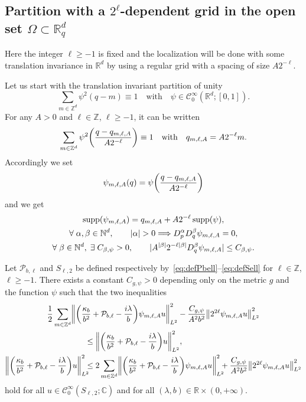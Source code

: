 \documentclass[10pt]{amsart}
\theoremstyle{definition}\newtheorem{defi}[theo]{Definition}\newtheorem{rema}[theo]{Remark}\newtheorem{exam}[theo]{Example}\newtheorem{exem}[theo]{Example}\newtheorem{nota}[theo]{Notation}
\newcommand{\C}{\mathbb{C}}
\newcommand{\Z}{\mathbb{Z}}
\newcommand{\R}{\mathbb{R}}
\newcommand{\N}{\mathbb{N}}
\newcommand{\clC}{\mathcal{C}}
\newcommand{\clP}{\mathcal{P}}
\DeclareMathOperator{\suppp}{supp}
\newcommand\norm[1]{\left\lVert#1\right\rVert}
\let\oldexists\exists
\renewcommand*{\exists}{\mathrel{\oldexists}}
\let\oldforall\forall
\renewcommand*{\forall}{\mathrel{\oldforall}}
\let\originalleft\left
\let\originalright\right
\renewcommand{\left}{\mathopen{}\mathclose\bgroup\originalleft}
\renewcommand{\right}{\aftergroup\egroup\originalright}
\renewcommand*{\implies}{\mathchoice{\Longrightarrow}{\Rightarrow}{\Rightarrow}{\Rightarrow}}
\begin{document}
\subsection{Partition with a \texorpdfstring{$2^\ell$}{2\^l}-dependent grid in the open set \texorpdfstring{$\Omega\subset\R^d_q$}{Omegac R\^d\_q}}\label{sec:gridpart}
Here the integer $\ell\geq -1$ is fixed and the localization will be done with some translation invariance in $\R^d$ by using a regular grid with a spacing of size $A2^{-\ell}$.

Let us start with the translation invariant partition of unity
\begin{equation}\label{eq:DefinitionOfPsi}
\sum_{m\in\Z^d}\psi^2(q-m)\equiv 1\quad\text{with}\quad\psi\in \clC^{\infty}_0(\R^d;[0,1]).
\end{equation}
For any $A>0$ and $\ell\in\Z$, $\ell\geq -1$, it can be written
\[
\sum_{m\in\Z^d}\psi^2\left(\frac{q-q_{m,\ell,A}}{A2^{-\ell}}\right)\equiv 1\quad \text{with}\quad q_{m,\ell,A}=A2^{-\ell}m.
\]
Accordingly we set
\[
\psi_{m,\ell,A}(q)=\psi\left(\frac{q-q_{m,\ell,A}}{A2^{-\ell}}\right)
\]
and we get
\begin{gather}
 \suppp(\psi_{m,\ell,A}) = q_{m,\ell,A}+A2^{-\ell}\suppp(\psi), \\
\forall \alpha, \beta \in \N^{d}, \qquad |\alpha|>0 \implies D_{p}^{\alpha}D_{q}^{\beta}\psi_{m,\ell,A} = 0, \\
\forall \beta \in \N^{d}, \;\exists C_{\beta,\psi}>0, \qquad |A^{|\beta|}2^{-\ell|\beta|} D_{q}^{\beta}\psi_{m,\ell,A}| \leq C_{\beta,\psi}.\label{eq:derpsimellA}
\end{gather}

\pagebreak
\begin{prop}\label{pr:controlOfErrorAfterGridPartitionOfUnity}
Let $\clP_{b,\ell}$ and $S_{\ell,2}$ be defined respectively by~\eqref{eq:defPbell}--\eqref{eq:defSell} for $\ell\in\Z$, $\ell\geq -1$. There exists a constant $C_{g,\psi}>0$ depending only on the metric $g$ and the function $\psi$ such that the two inequalities
\begin{multline*}
\frac{1}{2}\sum_{m\in \Z^d}\left\| \left(\frac{\kappa_{b}}{b^{2}}+\clP_{b,\ell} - \frac{i\lambda}{b}\right) \psi_{m,\ell,A}u \right\|^{2}_{L^2}-\frac{C_{g,\psi}}{A^2b^2}\norm{2^{2\ell}\psi_{m,\ell,A}u}_{L^2}^2\\
\begin{aligned}
&\leq
\left\| \left(\frac{\kappa_{b}}{b^{2}}+\clP_{b,\ell} - \frac{i\lambda}{b}\right) u \right\|^{2}_{L^2},\quad
\\
\left\| \left(\frac{\kappa_{b}}{b^{2}}+\clP_{b,\ell} - \frac{i\lambda}{b}\right) u \right\|^{2}_{L^2}\mkern-10mu &\leq 2 \sum_{m\in\Z^d}\left\| \left(\frac{\kappa_{b}}{b^{2}}+\clP_{b,\ell}-\frac{i\lambda}{b}\right) \psi_{m,\ell,A} u \right\|^{2}_{L^2}\mkern-10mu+\frac{C_{g,\psi}}{A^2b^2}\norm{2^{2\ell}\psi_{m,\ell,A}u}_{L^2}^2
\end{aligned}
\end{multline*}
hold for all $u\in \clC^{\infty}_0(S_{\ell,2};\C)$ and for all $(\lambda,b)\in\R\times (0,+\infty)$.
\end{prop}
\end{document}
